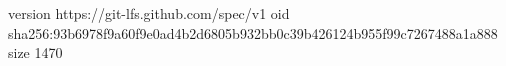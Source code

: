 version https://git-lfs.github.com/spec/v1
oid sha256:93b6978f9a60f9e0ad4b2d6805b932bb0c39b426124b955f99c7267488a1a888
size 1470

